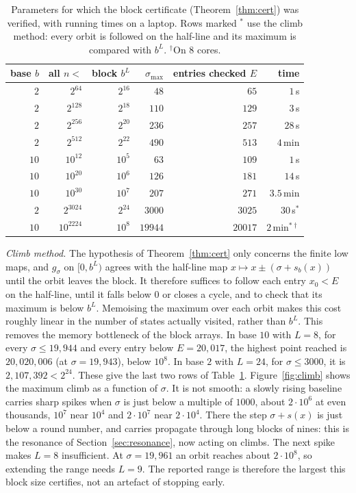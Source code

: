 \documentclass[11pt]{article}
\theoremstyle{definition}
\theoremstyle{remark}
\begin{document}
\begin{table}[h]
\centering
\begin{tabular}{rrrrrr}
\toprule
base $b$ & all $n<$ & block $b^L$ & $\sigma_{\max}$ & entries checked $E$ & time\\
\midrule
$2$ & $2^{64}$ & $2^{16}$ & $48$ & $65$ & $1$\,s\\
$2$ & $2^{128}$ & $2^{18}$ & $110$ & $129$ & $3$\,s\\
$2$ & $2^{256}$ & $2^{20}$ & $236$ & $257$ & $28$\,s\\
$2$ & $2^{512}$ & $2^{22}$ & $490$ & $513$ & $4$\,min\\
$10$ & $10^{12}$ & $10^{5}$ & $63$ & $109$ & $1$\,s\\
$10$ & $10^{20}$ & $10^{6}$ & $126$ & $181$ & $14$\,s\\
$10$ & $10^{30}$ & $10^{7}$ & $207$ & $271$ & $3.5$\,min\\
\midrule
$2$ & $2^{3024}$ & $2^{24}$ & $3000$ & $3025$ & $30$\,s$^*$\\
$10$ & $10^{2224}$ & $10^{8}$ & $19944$ & $20017$ & $2$\,min$^{*\dagger}$\\
\bottomrule
\end{tabular}
\caption{Parameters for which the block certificate (Theorem~\ref{thm:cert})
was verified, with running times on a laptop. Rows marked $^*$ use the
climb method: every orbit is followed on the half-line and its maximum is
compared with $b^L$. $^\dagger$On $8$ cores.}\label{tab:cert}
\end{table}

\emph{Climb method.} The hypothesis of Theorem~\ref{thm:cert} only concerns
the finite low maps, and $g_\sigma$ on $[0,b^L)$ agrees with the half-line map
$x\mapsto x\pm(\sigma+s_b(x))$ until the orbit leaves the block. It therefore
suffices to follow each entry $x_0<E$ on the half-line, until it falls below
$0$ or closes a cycle, and to check that its maximum is below $b^L$. Memoising
the maximum over each orbit makes this cost roughly linear in the number of
states actually visited, rather than $b^L$. This removes the memory
bottleneck of the block arrays. In base $10$ with $L=8$, for every
$\sigma\le19{,}944$ and every entry below $E=20{,}017$, the highest point reached
is $20{,}020{,}006$ (at $\sigma=19{,}943$), below $10^8$. In base $2$ with $L=24$,
for $\sigma\le3000$, it is $2{,}107{,}392<2^{24}$. These give the last two rows of
Table~\ref{tab:cert}. Figure~\ref{fig:climb} shows the maximum climb as a
function of $\sigma$. It is not smooth: a slowly rising baseline carries sharp
spikes when $\sigma$ is just below a multiple of $1000$, about $2\cdot10^6$ at
even thousands, $10^7$ near $10^4$ and $2\cdot10^7$ near $2\cdot10^4$. There the
step $\sigma+s(x)$ is just below a round number, and carries propagate
through long blocks of nines: this is the resonance of
Section~\ref{sec:resonance}, now acting on climbs. The next spike makes $L=8$
insufficient. At $\sigma=19{,}961$ an orbit reaches about $2\cdot10^8$, so
extending the range needs $L=9$. The reported range is therefore the largest
this block size certifies, not an artefact of stopping early.
\end{document}
